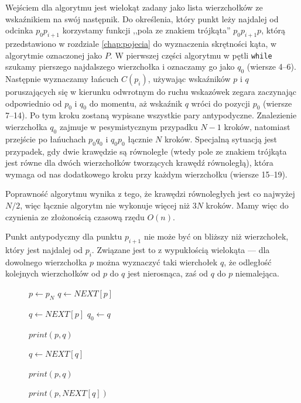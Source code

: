 Wejściem dla algorytmu jest wielokąt zadany jako lista wierzchołków ze
wskaźnikiem na swój następnik. Do określenia, który punkt leży
najdalej od odcinka $p_{0}p_{i+1}$ korzystamy funkcji ,,pola ze
znakiem trójkąta'' $p_{0}p_{i+1}p$, którą przedstawiono w
rozdziale \ref{chap:pojecia} do wyznaczenia skrętności kąta, w
algorytmie oznaczonej jako $P$. W pierwszej części algorytmu w pętli
\texttt{while} szukamy pierszego najdalszego wierzchołka i oznaczamy
go jako $q_0$ (wiersze 4--6). Następnie wyznaczamy łańcuch $C(p_i)$,
używając wskaźników $p$ i $q$ poruszających się w kierunku odwrotnym
do ruchu wskazówek zegara zaczynając odpowiednio od $p_0$ i $q_0$ do
momentu, aż wskaźnik $q$ wróci do pozycji $p_0$ (wiersze 7--14). Po
tym kroku zostaną wypisane wszystkie pary antypodyczne. Znalezienie
wierzchołka $q_0$ zajmuje w pesymistycznym przypadku $N-1$ kroków,
natomiast przejście po łańuchach $p_{0}q_{0}$ i $q_{0}p_{0}$ łącznie
$N$ kroków. Specjalną sytuacją jest przypadek, gdy dwie krawędzie są
równoległe (wtedy pole ze znakiem trójkąta jest równe dla dwóch
wierzchołków tworzących krawędź równoległą), która wymaga od nas
dodatkowego kroku przy każdym wierzchołku (wiersze 15--19).

Poprawność algorytmu wynika z tego, że krawędzi równoległych jest co
najwyżej $N/2$, więc łącznie algorytm nie wykonuje więcej niż $3N$
kroków. Mamy więc do czynienia ze złożonością czasową rzędu $O(n)$.

Punkt antypodyczny dla punktu $p_{i+1}$ nie może być on bliższy niż
wierzchołek, który jest najdalej od $p_i$. Związane jest to z
wypukłością wielokąta --- dla dowolnego wierzchołka $p$ można
wyznaczyć taki wierchołek $q$, że odległość kolejnych wierzchołków od
$p$ do $q$ jest nierosnąca, zaś od $q$ do $p$ niemalejąca.

\begin{figure}[htp]
\label{alg:antipodal}
\begin{algorithmic}[1]

\State $p \gets p_N$
\State $q \gets NEXT[p]$

    \State $q \gets NEXT[p]$
    \State $q_0 \gets q$

        \State $print (p, q)$

            \State $q \gets NEXT[q]$

                \State $print (p, q)$
            \EndIf
        \EndWhile

                \State $print (p, NEXT[q])$
            \EndIf
        \EndIf
    \EndWhile
\EndWhile
\EndProcedure

\end{algorithmic}
\end{figure}
